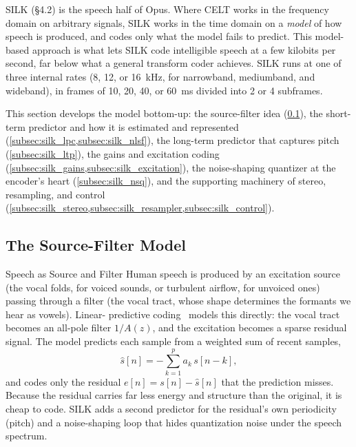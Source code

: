 SILK (\S4.2) is the speech half of Opus. Where CELT works in the frequency
domain on arbitrary signals, SILK works in the time domain on a \emph{model} of
how speech is produced, and codes only what the model fails to predict. This
model-based approach is what lets SILK code intelligible speech at a few
kilobits per second, far below what a general transform coder
achieves. SILK runs
at one of three internal rates (8, 12, or 16~kHz, for narrowband,
  mediumband, and
wideband), in frames of 10, 20, 40, or 60~ms divided into 2 or 4 subframes.

This section develops the model bottom-up: the source-filter idea
(\cref{subsec:silk_model}), the short-term predictor and how it is estimated and
represented (\cref{subsec:silk_lpc,subsec:silk_nlsf}), the long-term predictor
that captures pitch (\cref{subsec:silk_ltp}), the gains and excitation coding
(\cref{subsec:silk_gains,subsec:silk_excitation}), the noise-shaping
quantizer at
the encoder's heart (\cref{subsec:silk_nsq}), and the supporting machinery of
stereo, resampling, and control
(\cref{subsec:silk_stereo,subsec:silk_resampler,subsec:silk_control}).

\subsection{The Source-Filter Model}\label{subsec:silk_model}

\begin{concept}{Speech as Source and Filter}
  Human speech is produced by an excitation source (the vocal folds, for voiced
  sounds, or turbulent airflow, for unvoiced ones) passing through a filter (the
  vocal tract, whose shape determines the formants we hear as vowels). Linear-
  predictive coding~\cite{makhoul1975linear,rabiner1978digital} models this
  directly: the vocal tract becomes an all-pole filter $1/A(z)$, and the
  excitation becomes a sparse residual signal. The model predicts each sample
  from a weighted sum of recent samples,
  \begin{equation}\label{eq:lpc_predict}
    \hat{s}[n] = -\sum_{k=1}^{p} a_k\, s[n-k],
  \end{equation}
  and codes only the residual $e[n] = s[n] - \hat{s}[n]$ that the prediction
  misses. Because the residual carries far less energy and structure than the
  original, it is cheap to code. SILK adds a second predictor for the residual's
  own periodicity (pitch) and a noise-shaping loop that hides quantization noise
  under the speech spectrum.
\end{concept}

